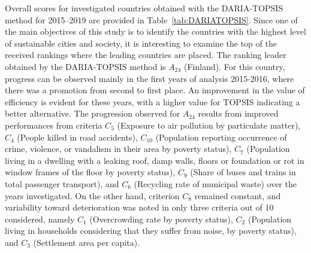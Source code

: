 \documentclass[final,5p,times,twocolumn,authoryear]{elsarticle}
\begin{document}
Overall scores for investigated countries obtained with the DARIA-TOPSIS method for 2015--2019 are provided in Table~\ref{tab:DARIATOPSIS}. Since one of the main objectives of this study is to identify the countries with the highest level of sustainable cities and society, it is interesting to examine the top of the received rankings where the leading countries are placed.
The ranking leader obtained by the DARIA-TOPSIS method is $A_{24}$ (Finland). For this country, progress can be observed mainly in the first years of analysis 2015-2016, where there was a promotion from second to first place. An improvement in the value of efficiency is evident for these years, with a higher value for TOPSIS indicating a better alternative. The progression observed for $A_{24}$ results from improved performances from criteria $C_{5}$ (Exposure to air pollution by
particulate matter), $C_{4}$ (People killed in road accidents), $C_{10}$ (Population reporting occurrence of crime, violence, or vandalism in
their area by poverty status), $C_{7}$ (Population living in a dwelling with a leaking roof, damp walls, floors or foundation or rot in window
frames of the floor by poverty status), $C_{9}$ (Share of buses and trains in total passenger transport), and $C_{6}$ (Recycling rate of municipal waste) over the years investigated. On the other hand, criterion $C_{8}$ remained constant, and variability toward deterioration was noted in only three criteria out of 10 considered, namely $C_{1}$ (Overcrowding rate by poverty status), $C_{2}$ (Population living in households considering that they suffer from noise, by poverty status), and $C_{3}$ (Settlement area per capita).
%
\end{document}
